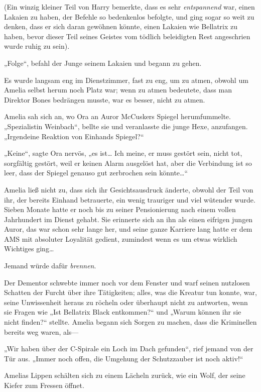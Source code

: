 {(Ein winzig kleiner Teil von Harry bemerkte, dass es sehr \emph{entspannend} war, einen Lakaien zu haben, der Befehle so bedenkenlos befolgte, und ging sogar so weit zu denken, dass er sich daran gewöhnen könnte, einen Lakaien wie Bellatrix zu haben, bevor dieser Teil seines Geistes vom tödlich beleidigten Rest angeschrien wurde ruhig zu sein).

„Folge“, befahl der Junge seinem Lakaien und begann zu gehen.

Es wurde langsam eng im Dienstzimmer, fast zu eng, um zu atmen, obwohl um Amelia selbst herum noch Platz war; wenn zu atmen bedeutete, dass man Direktor Bones bedrängen musste, war es besser, nicht zu atmen.

Amelia sah sich an, wo Ora an Auror McCuskers Spiegel herumfummelte. „Spezialistin Weinbach“, bellte sie und veranlasste die junge Hexe, anzufangen. „Irgendeine Reaktion von Einhands Spiegel?“

„Keine“, sagte Ora nervös, „es ist… Ich meine, er muss gestört sein, nicht tot, sorgfältig gestört, weil er keinen Alarm ausgelöst hat, aber die Verbindung ist so leer, dass der Spiegel genauso gut zerbrochen sein könnte…“

Amelia ließ nicht zu, dass sich ihr Gesichtsausdruck änderte, obwohl der Teil von ihr, der bereits Einhand betrauerte, ein wenig trauriger und viel wütender wurde. Sieben Monate hatte er noch bis zu seiner Pensionierung nach einem vollen Jahrhundert im Dienst gehabt. Sie erinnerte sich an ihn als einen eifrigen jungen Auror, das war schon sehr lange her, und seine ganze Karriere lang hatte er dem AMS mit absoluter Loyalität gedient, zumindest wenn es um etwas wirklich Wichtiges ging…

Jemand würde dafür \emph{brennen}.

Der Dementor schwebte immer noch vor dem Fenster und warf seinen nutzlosen Schatten der Furcht über ihre Tätigkeiten; alles, was die Kreatur tun konnte, war, seine Unwissenheit heraus zu röcheln oder überhaupt nicht zu antworten, wenn sie Fragen wie „Ist Bellatrix Black entkommen?“ und „Warum können ihr sie nicht finden?“ stellte. Amelia begann sich Sorgen zu machen, dass die Kriminellen bereits weg waren, als—

„Wir haben über der C-Spirale ein Loch im Dach gefunden“, rief jemand von der Tür aus. „Immer noch offen, die Umgehung der Schutzzauber ist noch aktiv!“

Amelias Lippen schälten sich zu einem Lächeln zurück, wie ein Wolf, der seine Kiefer zum Fressen öffnet.

}
